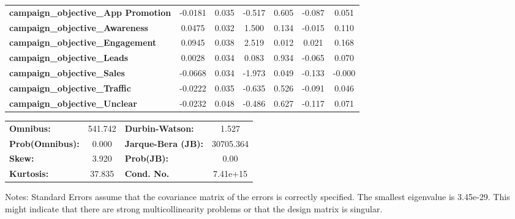 \begin{center}
\begin{tabular}{lcccccc}
\textbf{campaign\_objective\_App Promotion}                     &      -0.0181  &        0.035     &    -0.517  &         0.605        &       -0.087    &        0.051     \\
\textbf{campaign\_objective\_Awareness}                         &       0.0475  &        0.032     &     1.500  &         0.134        &       -0.015    &        0.110     \\
\textbf{campaign\_objective\_Engagement}                        &       0.0945  &        0.038     &     2.519  &         0.012        &        0.021    &        0.168     \\
\textbf{campaign\_objective\_Leads}                             &       0.0028  &        0.034     &     0.083  &         0.934        &       -0.065    &        0.070     \\
\textbf{campaign\_objective\_Sales}                             &      -0.0668  &        0.034     &    -1.973  &         0.049        &       -0.133    &       -0.000     \\
\textbf{campaign\_objective\_Traffic}                           &      -0.0222  &        0.035     &    -0.635  &         0.526        &       -0.091    &        0.046     \\
\textbf{campaign\_objective\_Unclear}                           &      -0.0232  &        0.048     &    -0.486  &         0.627        &       -0.117    &        0.071     \\
\bottomrule
\end{tabular}
\begin{tabular}{lclc}
\textbf{Omnibus:}       & 541.742 & \textbf{  Durbin-Watson:     } &     1.527  \\
\textbf{Prob(Omnibus):} &   0.000 & \textbf{  Jarque-Bera (JB):  } & 30705.364  \\
\textbf{Skew:}          &   3.920 & \textbf{  Prob(JB):          } &      0.00  \\
\textbf{Kurtosis:}      &  37.835 & \textbf{  Cond. No.          } &  7.41e+15  \\
\bottomrule
\end{tabular}
\end{center}

Notes: \newline
 [1] Standard Errors assume that the covariance matrix of the errors is correctly specified. \newline
 [2] The smallest eigenvalue is 3.45e-29. This might indicate that there are \newline
 strong multicollinearity problems or that the design matrix is singular.